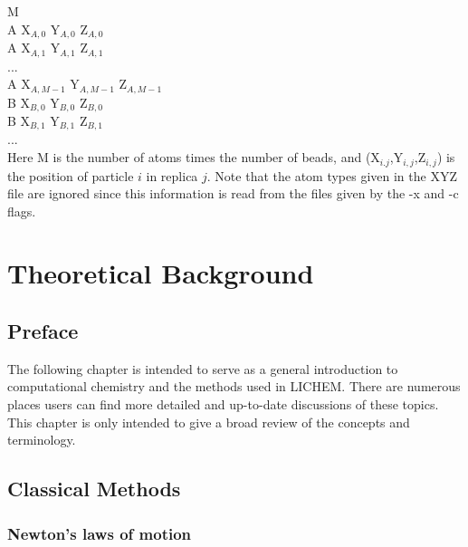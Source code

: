 \documentclass[12pt]{report}
\begin{document}
M \\

A  X$_{A,0}$  Y$_{A,0}$  Z$_{A,0}$ \\
A  X$_{A,1}$  Y$_{A,1}$  Z$_{A,1}$ \\
... \\
A  X$_{A,M-1}$  Y$_{A,M-1}$  Z$_{A,M-1}$ \\
B  X$_{B,0}$  Y$_{B,0}$  Z$_{B,0}$ \\
B  X$_{B,1}$  Y$_{B,1}$  Z$_{B,1}$ \\
... \\

Here M is the number of atoms times the number of beads, and
(X$_{i.j}$,Y$_{i,j}$,Z$_{i,j}$) is the position of particle $i$ in replica
$j$.
Note that the atom types given in the XYZ file are ignored since this
information is read from the files given by the -x and -c flags.

\chapter{Theoretical Background}
\label{chap:Theory}

\section{Preface}

The following chapter is intended to serve as a general introduction to
computational chemistry and the methods used in LICHEM.
There are numerous places users can find more detailed and up-to-date
discussions of these topics.
This chapter is only intended to give a broad review of the concepts and
terminology.

\section{Classical Methods}

\subsection{Newton's laws of motion}
\end{document}
